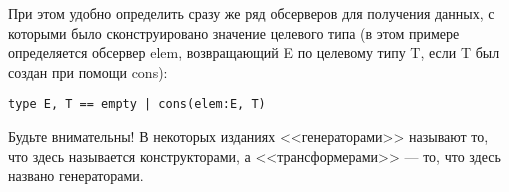 При этом удобно определить сразу же ряд обсерверов для получения данных, с которыми было сконструировано значение целевого типа (в этом примере определяется обсервер elem, возвращающий E по целевому типу T, если T был создан при помощи cons):
\begin{lstlisting}
type E, T == empty | cons(elem:E, T)
\end{lstlisting}

Будьте внимательны! В некоторых изданиях <<генераторами>> называют то, что здесь называется конструкторами, а <<трансформерами>> --- то, что здесь названо генераторами.

